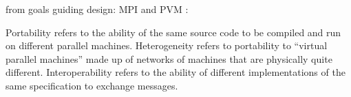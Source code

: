 

from goals guiding design: MPI and PVM :

Portability refers to the ability of the same source code to
be compiled and run on different parallel machines.
Heterogeneity refers to portability to ``virtual parallel machines''
made up of networks of machines that are physically quite
different.
Interoperability refers to the ability of different
implementations of the same specification to exchange messages.

